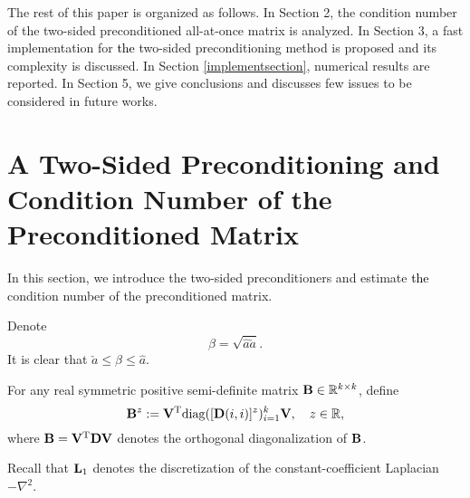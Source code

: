 \documentclass[11pt]{article}%
\numberwithin{equation}{section}
\newcommand{\diag}{\mathrm{diag}}
\begin{document}
The rest of this paper is organized as follows. 
In Section 2, the condition number of the two-sided preconditioned all-at-once  matrix is analyzed.
In Section 3, a fast implementation for \textcolor{black}{the} two-sided preconditioning method is proposed and
its complexity is discussed.
In Section \ref{implementsection}, numerical results are reported. In Section 5, we give conclusions and discusses few issues to be considered in future works.



\section{A Two-Sided Preconditioning and Condition Number of the Preconditioned Matrix} \label{mainrsltsec}
In this section, we introduce the two-sided preconditioners and estimate \textcolor{black}{the} condition number of the preconditioned matrix. 

Denote
\begin{equation*}
\beta=\sqrt{\hat{a}\check{a}}.
\end{equation*}
It is clear that $\check{a}\leq\beta\leq\hat{a}$.


For any real symmetric positive semi-definite matrix ${\bf B}\in\mathbb{R}^{k\times k}$, define $${\bf B}^{z}:={\bf V}^{\rm T}\diag([{\bf D}(i,i)]^z)_{i=1}^{k}{\bf V},\quad z\in\mathbb{R},$$ where ${\bf B}={\bf V}^{\rm T}{\bf D}{\bf V}$ denotes the orthogonal diagonalization of ${\bf B}$.



Recall that ${\bf L}_{1}$ denotes the discretization of the constant-coefficient Laplacian $-\nabla^2$.
\end{document}

